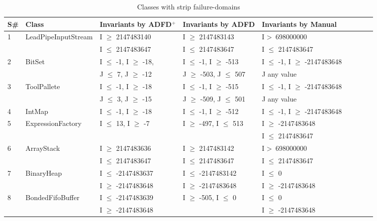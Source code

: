 {\scriptsize
\begin{longtable}{|l|l|l|l|l|l|l|l|l|}
  \caption{Classes with strip failure-domains}\\
  
  \hline
S\#  & Class						& Invariants by ADFD$^+$       		& Invariants by ADFD     			& Invariants by Manual	\\
  \hline
  \endhead
1	&LeadPipeInputStream 		& I $\ge$ 2147483140			& I $\ge$ 2147483143			& I \textgreater~698000000					\\ 
	&                                             & I $\le$ 2147483647	  		& I $\le$ 2147483647 			& I $\le$ 2147483647					\\
2	& BitSet				  		& I $\le$ -1, I $\ge$ -18,			& I $\le$ -1, I $\ge$ -513			& I $\le$ -1, I $\ge$ -2147483648	\\ 
	&                                             & J $\le$ 7, J $\ge$ -12  			& J $\ge$ -503, J $\le$ 507		& J any value									\\ %
3	& ToolPallete			  		& I $\le$ -1, I $\ge$ -18			& I $\le$ -1, I $\ge$ -515			& I $\le$ -1, I $\ge$ -2147483648	\\ 
	&                                             & J $\le$ 3, J $\ge$ -15			& J $\ge$ -509, J $\le$ 501		& J any value			   						\\
4	& IntMap			  		& I $\le$ -1, I $\ge$ -18			& I $\le$ -1, I $\ge$ -512			& I $\le$ -1, I $\ge$ -2147483648	\\
5	& ExpressionFactory	  		& I $\le$ 13, I $\ge$ -7			& I $\ge$ -497, I $\le$ 513		& I $\ge$ -2147483648 				\\ %
	&                                             & 								&								& I $\le$ 2147483647					\\
6	& ArrayStack					& I $\ge$ 2147483636			& I $\ge$ 2147483142			& I \textgreater~698000000 					\\ 
	&                                             & I $\le$ 2147483647 			& I $\le$ 2147483647 			& I $\le$ 2147483647 					\\
7	& BinaryHeap				& I $\le$ -2147483637			& I $\le$ -2147483142			& I $\le$ 0								 \\	
	&                                             & I $\ge$ -2147483648			& I $\ge$ -2147483648			& I $\ge$ -2147483648				\\
8	& BondedFifoBuffer			& I $\le$ -2147483639 			& I $\ge$ -505, I $\le$ 0			& I $\le$ 0 								\\
	&                                             & I $\ge$ -2147483648			& 								& I $\ge$ -2147483648				\\	

\end{longtable}}
